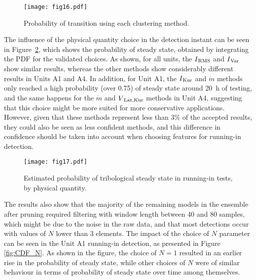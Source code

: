 \documentclass[preprint,11pt,number]{elsarticle}
\begin{document}
\begin{figure}[htb]
\begin{center}
\texttt{[image: fig16.pdf]}    %
\caption{Probability of transition using each clustering method.}
\label{fig:clusterCompare}
\end{center}
\end{figure}

The influence of the physical quantity choice in the detection instant can be seen in Figure~\ref{fig:PDF_Grandeza}, which shows the probability of steady state, obtained by integrating the PDF for the validated choices. As shown, for all units, the $I\textsubscript{RMS}$ and $I\textsubscript{Var}$ show similar results, whereas the other methods show considerably different results in Units A1 and A4. In addition, for Unit A1, the $I\textsubscript{Kur}$ and $\dot{m}$ methods only reached a high probability (over 0.75) of steady state around \SI{20}{\hour} of testing, and the same happens for the $\dot{m}$ and $V\textsubscript{Lat,Kur}$ methods in Unit A4, suggesting that this choice might be more suited for more conservative applications. However, given that these methods represent less than 3\% of the accepted results, they could also be seen as less confident methods, and this difference in confidence should be taken into account when choosing features for running-in detection.

\begin{figure}[htb]
\begin{center}
\texttt{[image: fig17.pdf]}    %
\caption{Estimated probability of tribological steady state in running-in tests, by physical quantity.} 
\label{fig:PDF_Grandeza}
\end{center}
\end{figure}

The results also show that the majority of the remaining models in the ensemble after pruning required filtering with window length between 40 and 80 samples, which might be due to the noise in the raw data, and that most detections occur with values of $N$ lower than 3 elements. The impact of the choice of $N$ parameter can be seen in the Unit A1 running-in detection, as presented in Figure \ref{fig:CDF_N}. As shown in the figure, the choice of $N=1$ resulted in an earlier rise in the probability of steady state, while other choices of $N$ were of similar behaviour in terms of probability of steady state over time among themselves.
\end{document}
